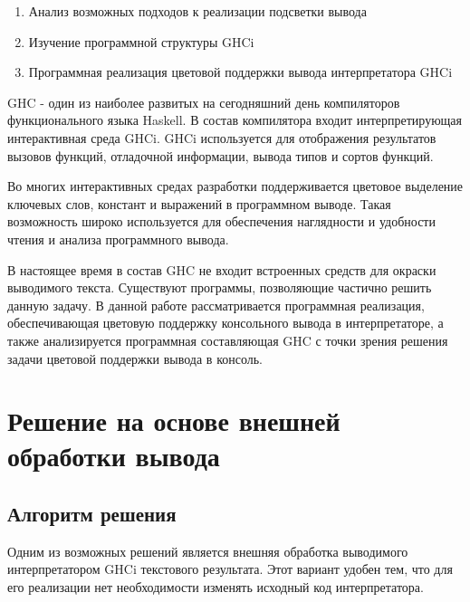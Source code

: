 







\begin{enumerate}
  \item Анализ возможных подходов к реализации подсветки вывода
  \item Изучение программной структуры GHCi
  \item Программная реализация цветовой поддержки вывода интерпретатора GHCi
\end{enumerate}  

\newpage
  
\tableofcontents

\newpage

\Intro

GHC - один из наиболее развитых на сегодняшний день компиляторов функционального языка Haskell. В состав компилятора входит интерпретирующая интерактивная среда GHCi. GHCi используется для отображения результатов вызовов функций, отладочной информации, вывода типов и сортов функций.

Во многих интерактивных средах разработки поддерживается цветовое выделение  ключевых слов, констант и выражений в программном выводе. Такая возможность широко используется для обеспечения наглядности и удобности чтения и анализа программного вывода.

В настоящее время в состав GHC не входит встроенных средств для окраски выводимого текста. Существуют программы, позволяющие частично решить данную задачу. В данной работе рассматривается программная реализация, обеспечивающая цветовую поддержку консольного вывода в интерпретаторе, а также анализируется программная составляющая GHC с точки зрения решения задачи цветовой поддержки вывода в консоль.

\section{Решение на основе внешней обработки вывода}
\subsection{Алгоритм решения}
Одним из возможных решений является внешняя обработка выводимого интерпретатором GHCi текстового результата. Этот вариант удобен тем, что для его реализации нет необходимости изменять исходный код интерпретатора.


